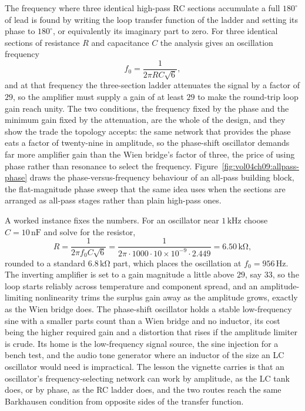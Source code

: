 The frequency where three identical high-pass RC sections accumulate a full
$180^\circ$ of lead is found by writing the loop transfer function of the ladder
and setting its phase to $180^\circ$, or equivalently its imaginary part to zero.
For three identical sections of resistance $R$ and capacitance $C$ the analysis
gives an oscillation frequency
\[
f_0 = \frac{1}{2\pi RC\sqrt{6}},
\]
and at that frequency the three-section ladder attenuates the signal by a factor
of $29$, so the amplifier must supply a gain of at least $29$ to make the
round-trip loop gain reach unity. The two conditions, the frequency fixed by the
phase and the minimum gain fixed by the attenuation, are the whole of the design,
and they show the trade the topology accepts: the same network that provides the
phase eats a factor of twenty-nine in amplitude, so the phase-shift oscillator
demands far more amplifier gain than the Wien bridge's factor of three, the price
of using phase rather than resonance to select the frequency.
Figure~\ref{fig:vol04ch09:allpass-phase} draws the phase-versus-frequency
behaviour of an all-pass building block, the flat-magnitude phase sweep that the
same idea uses when the sections are arranged as all-pass stages rather than
plain high-pass ones.



A worked instance fixes the numbers. For an oscillator near $1\,\si{\kilo\hertz}$
choose $C = 10\,\si{\nano\farad}$ and solve for the resistor,
\[
R = \frac{1}{2\pi f_0 C\sqrt{6}}
= \frac{1}{2\pi\cdot 1000\cdot 10\times 10^{-9}\cdot 2.449}
= 6.50\,\si{\kilo\ohm},
\]
rounded to a standard $6.8\,\si{\kilo\ohm}$ part, which places the oscillation at
$f_0 = 956\,\si{\hertz}$. The inverting amplifier is set to a gain magnitude a
little above $29$, say $33$, so the loop starts reliably across temperature and
component spread, and an amplitude-limiting nonlinearity trims the surplus gain
away as the amplitude grows, exactly as the Wien bridge does. The phase-shift
oscillator holds a stable low-frequency sine with a smaller parts count than a
Wien bridge and no inductor, its cost being the higher required gain and a
distortion that rises if the amplitude limiter is crude. Its home is the
low-frequency signal source, the sine injection for a bench test, and the audio
tone generator where an inductor of the size an LC oscillator would need is
impractical. The lesson the vignette carries is that an oscillator's
frequency-selecting network can work by amplitude, as the LC tank does, or by
phase, as the RC ladder does, and the two routes reach the same Barkhausen
condition from opposite sides of the transfer function.

